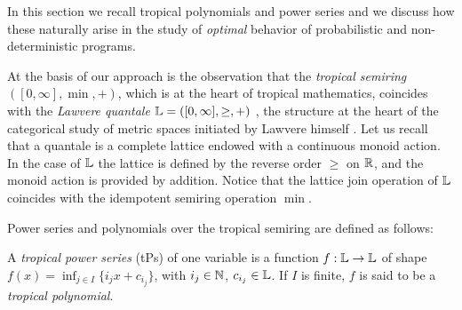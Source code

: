 %

In this section we recall tropical polynomials and power series and we discuss how these naturally arise in the study of \emph{optimal} behavior of probabilistic and non-deterministic programs. 


At the basis of our approach is the observation that the \emph{tropical semiring} $([0,\infty], \min, +)$, which is at the heart of tropical mathematics, coincides with the \emph{Lawvere quantale} $\mathbb{L}=([0,\infty], \geq, +)$ \cite{Hofmann2014, Stubbe2014}, the structure at the heart of the categorical study of metric spaces initiated by Lawvere himself \cite{Lawvere1973}.
Let us recall that a quantale is a complete lattice endowed with a continuous monoid action. In the case of $\mathbb{L}$ the lattice is defined by the reverse order $\geq$ on $\mathbb{R}$, and the monoid action is provided by addition. Notice that the lattice join operation of $\mathbb{L}$ coincides with the idempotent semiring operation $\min$. 




Power series and polynomials over the tropical semiring are defined as follows:


\begin{definition}
A \emph{tropical power series}
(tPs) of one variable is a function $f:\mathbb{L}\to\mathbb{L}$ of shape $f(x)=\inf_{j\in I}\{i_j x+c_{i_{j}}\}$, with $i_{j}\in\mathbb{N}$, $c_{i_{j}}\in\mathbb{L}$.
If $I$ is finite, $f$ is said to be a \emph{tropical polynomial}. 
\end{definition}

